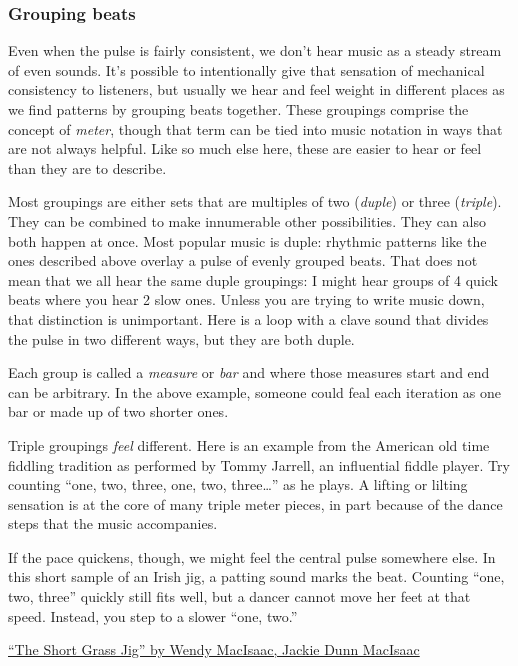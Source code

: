 \documentclass[twoside]{article}
\begin{document}
\hypertarget{grouping-beats}{%
\subsubsection{Grouping beats}\label{grouping-beats}}

Even when the pulse is fairly consistent, we don't hear music as a
steady stream of even sounds. It's possible to intentionally give that
sensation of mechanical consistency to listeners, but usually we hear
and feel weight in different places as we find patterns by grouping
beats together. These groupings comprise the concept of \emph{meter},
though that term can be tied into music notation in ways that are not
always helpful. Like so much else here, these are easier to hear or feel
than they are to describe.

Most groupings are either sets that are multiples of two (\emph{duple})
or three (\emph{triple}). They can be combined to make innumerable other
possibilities. They can also both happen at once. Most popular music is
duple: rhythmic patterns like the ones described above overlay a pulse
of evenly grouped beats. That does not mean that we all hear the same
duple groupings: I might hear groups of 4 quick beats where you hear 2
slow ones. Unless you are trying to write music down, that distinction
is unimportant. Here is a loop with a clave sound that divides the pulse
in two different ways, but they are both duple.

\hypertarget{example12}{}

Each group is called a \emph{measure} or \emph{bar} and where those
measures start and end can be arbitrary. In the above example, someone
could feal each iteration as one bar or made up of two shorter ones.

Triple groupings \emph{feel} different. Here is an example from the
American old time fiddling tradition as performed by Tommy Jarrell, an
influential fiddle player. Try counting ``one, two, three, one, two,
three\ldots{}'' as he plays. A lifting or lilting sensation is at the
core of many triple meter pieces, in part because of the dance steps
that the music accompanies.

If the pace quickens, though, we might feel the central pulse somewhere
else. In this short sample of an Irish jig, a patting sound marks the
beat. Counting ``one, two, three'' quickly still fits well, but a dancer
cannot move her feet at that speed. Instead, you step to a slower ``one,
two.''

\href{https://folkways.si.edu/wendy-macisaac-fiddle-jackie-dunn-macisaac-piano/the-short-grassjig/the-braes-of-elchies-jig/traditional-jig/gallaghers-jig/the-pibroch-of-odonal-dubh/celtic-old-time-world/music/track/smithsonian}{``The
Short Grass Jig'' by Wendy MacIsaac, Jackie Dunn MacIsaac}
\end{document}
